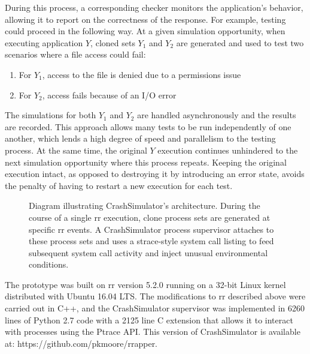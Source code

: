 During this process,
a corresponding checker
monitors the application's behavior,
allowing it to report on the correctness of the response.
For example, testing could proceed in the following way.
At a given simulation opportunity, when executing application $Y$,
cloned sets $Y_1$ and $Y_2$ are generated and
used to test two scenarios where a file access could fail:
\begin{enumerate}
    \item{For $Y_1$, access to the file is denied due to a permissions issue}
    \item{For $Y_2$, access fails because of an I/O error}
\end{enumerate}
The simulations for both $Y_1$ and $Y_2$ are handled asynchronously and
the results are recorded.
This approach allows many tests to be run independently of one another,
which lends a
high degree of speed and
parallelism to the testing process.
At the same time, the original $Y$ execution continues unhindered to the
next simulation opportunity where this process repeats.
Keeping the original execution intact,
as opposed to destroying it by introducing an error state,
avoids the penalty
of having to restart a new execution for each test.

\begin{figure}[t]
  \center{}
  \caption{Diagram illustrating CrashSimulator's architecture.  During the
    course of a single rr execution, clone process sets are generated at
    specific rr events.  A CrashSimulator process supervisor attaches to
    these process sets and uses a strace-style system call listing to feed
    subsequent system call activity and inject unusual environmental
    conditions.}
  \label{figure:architecture}
\end{figure}

The prototype was built on rr version 5.2.0 running on a 32-bit Linux kernel
distributed with Ubuntu 16.04 LTS.  The modifications to rr described above
were carried out in C++, and the CrashSimulator
supervisor was implemented in 6260 lines of Python 2.7 code with a 2125
line C extension that allows it to interact with processes using the Ptrace
API.
This version of CrashSimulator is available at:
https://github.com/pkmoore/rrapper.
